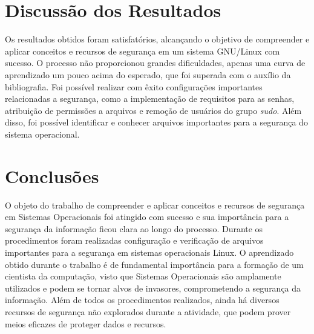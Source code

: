 \documentclass[
    12pt,				%
    oneside,   	        %
    a4paper,			%
    english,			%
    french,				%
    spanish,			%
    brazil,				%
    ]{pacotes/abntex2}
\begin{document}
\section{Discussão dos Resultados}
\label{sec:discussao}

Os resultados obtidos foram satisfatórios, alcançando o objetivo de compreender e aplicar conceitos e recursos de segurança em um sistema GNU/Linux com sucesso. O processo não proporcionou grandes dificuldades, apenas uma curva de aprendizado um pouco acima do esperado, que foi superada com o auxílio da bibliografia. Foi possível realizar com êxito configurações importantes relacionadas a segurança, como a implementação de requisitos para as senhas, atribuição de permissões a arquivos e remoção de usuários do grupo \textit{sudo}. Além disso, foi possível identificar e conhecer arquivos importantes para a segurança do sistema operacional.

\section{Conclusões}
\label{sec:conclusoes}

O objeto do trabalho de compreender e aplicar conceitos e recursos de segurança em Sistemas Operacionais foi atingido com sucesso e sua importância para a segurança da informação ficou clara ao longo do processo. Durante os procedimentos foram realizadas configuração e verificação de arquivos importantes para a segurança em sistemas operacionais Linux. O aprendizado obtido durante o trabalho é de fundamental importância para a formação de um cientista da computação, visto que Sistemas Operacionais são amplamente utilizados e podem se tornar alvos de invasores, comprometendo a segurança da informação. Além de todos os procedimentos realizados, ainda há diversos recursos de segurança não explorados durante a atividade, que podem prover meios eficazes de proteger dados e recursos.

\postextual
\renewcommand{\bibsection}{%
\section{\bibname}
\bibmark
\prebibhook}


\end{document}
